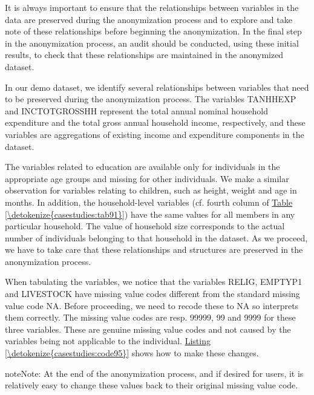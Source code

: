 \documentclass[letterpaper,10pt,english]{sphinxmanual}
\begin{document}
It is always important to ensure that the relationships between
variables in the data are preserved during the anonymization process and
to explore and take note of these relationships before beginning the
anonymization. In the final step in the anonymization process, an audit
should be conducted, using these initial results, to check that these
relationships are maintained in the anonymized dataset.

In our demo dataset, we identify several relationships between variables
that need to be preserved during the anonymization process. The
variables TANHHEXP and INCTOTGROSSHH represent the total annual nominal
household expenditure and the total gross annual household income,
respectively, and these variables are aggregations of existing income
and expenditure components in the dataset.

The variables related to education are available only for individuals in
the appropriate age groups and missing for other individuals. We make a
similar observation for variables relating to children, such as height,
weight and age in months. In addition, the household-level variables
(cf. fourth column of \hyperref[\detokenize{casestudies:tab91}]{Table \ref{\detokenize{casestudies:tab91}}}) have the same values for all members in
any particular household. The value of household size corresponds to the
actual number of individuals belonging to that household in the dataset.
As we proceed, we have to take care that these relationships and
structures are preserved in the anonymization process.

When tabulating the variables, we notice that the variables RELIG,
EMPTYP1 and LIVESTOCK have missing value codes different from the 
standard missing value code NA. Before proceeding, we need to recode
these to NA so  interprets them correctly. The missing value codes
are resp. 99999, 99 and 9999 for these three variables. These are
genuine missing value codes and not caused by the variables being not
applicable to the individual. \hyperref[\detokenize{casestudies:code95}]{Listing \ref{\detokenize{casestudies:code95}}} shows how to make these
changes.

\begin{sphinxadmonition}{note}{Note:}
At the end of the anonymization process, and if desired
for users, it is relatively easy to change these values back to their
original missing value code.
\end{sphinxadmonition}
\end{document}

